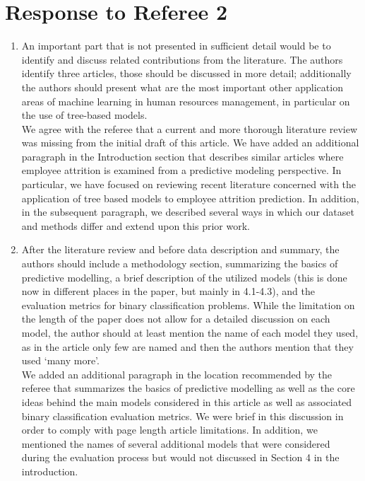 \documentclass{amsart}[12pt]
\begin{document}
\section{Response to Referee 2}

\begin{enumerate}
    \item   {\color{blue} 
        An important part that is not presented in sufficient detail would be to identify and discuss related contributions from the literature. The authors identify three articles, those should be discussed in more detail; additionally the authors should present what are the most important other application areas of machine learning in human resources management, in particular on the use of tree-based models. 
        }\\

We agree with the referee that a current and more thorough literature review was missing from the 
initial draft of this article.  We have added an additional paragraph in the Introduction section 
that describes similar articles where employee attrition is examined from a predictive modeling 
perspective. In particular, we have focused on reviewing recent literature concerned with the 
        application of tree based models to employee attrition prediction.
        In addition, in the subsequent paragraph, we described several ways in which 
our dataset and methods differ and extend upon this prior work. 

    \item   {\color{blue} 
        After the literature review and before data description and summary, the authors should include a methodology section, summarizing the basics of predictive modelling, a brief description of the utilized models (this is done now in different places in the paper, but mainly in 4.1-4.3), and the evaluation metrics for binary classification problems. While the limitation on the length of the paper does not allow for a detailed discussion on each model, the author should at least mention the name of each model they used, as in the article only few are named and then the authors mention that they used ‘many more’.
        }\\

        We added an additional paragraph in the location recommended by the referee that summarizes the basics of 
        predictive modelling as well as the core ideas behind the main models considered in this article 
        as well as associated binary classification evaluation metrics.  We were brief in this discussion in 
        order to comply with page length article limitations.  In addition, we mentioned the names of several 
        additional models that were considered during the evaluation process but would not discussed in Section
        4 in the introduction.


\end{enumerate}
\end{document}
